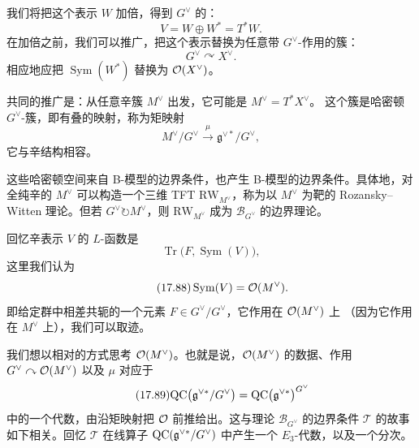
我们将把这个表示 $W$ 加倍，得到 $G^{\vee}$ 的：
\begin{equation}\tag{17.84}\label{eq:17.84}
V=W\oplus W^*=T^*W.
\end{equation}
在加倍之前，我们可以推广，把这个表示替换为任意带 $G^{\vee}$-作用的簇：
\begin{equation}\tag{17.85}\label{eq:17.85}
G^{\vee}\curvearrowright X^{\vee}.
\end{equation}
相应地应把 $\operatorname{Sym}(W^*)$ 替换为 $\mathcal{O}(X^{\vee})$。

共同的推广是：从任意辛簇 $M^{\vee}$ 出发，它可能是 $M^{\vee}=T^*X^{\vee}$。
这个簇是哈密顿 $G^{\vee}$-簇，即有叠的映射，称为矩映射
\begin{equation}\tag{17.86}\label{eq:17.86}
M^{\vee}/G^{\vee}\xrightarrow{\ \mu\ }\mathfrak g^{\vee*}/G^{\vee},
\end{equation}
它与辛结构相容。

这些哈密顿空间来自 B-模型的边界条件，也产生 B-模型的边界条件。具体地，对全纯辛的
$M^{\vee}$ 可以构造一个三维 TFT $\mathrm{RW}_{M^{\vee}}$，称为以 $M^{\vee}$ 为靶的
Rozansky--Witten 理论。但若 $G^{\vee}\circlearrowright M^{\vee}$，则 $\mathrm{RW}_{M^{\vee}}$
成为 $\mathcal B_{G^{\vee}}$ 的边界理论。

回忆辛表示 $V$ 的 $L$-函数是
\begin{equation}\tag{17.87}\label{eq:17.87}
\operatorname{Tr}\bigl(F,\operatorname{Sym}(V)\bigr),
\end{equation}
这里我们认为
\begin{equation}\tag{17.88}\label{eq:17.88}
\operatorname{Sym}(V)=\mathcal{O}(M^{\vee}).
\end{equation}
即给定群中相差共轭的一个元素 $F\in G^{\vee}/G^{\vee}$，它作用在 $\mathcal{O}(M^{\vee})$ 上
（因为它作用在 $M^{\vee}$ 上），我们可以取迹。

我们想以相对的方式思考 $\mathcal{O}(M^{\vee})$。也就是说，$\mathcal{O}(M^{\vee})$ 的数据、作用
$G^{\vee}\curvearrowright\mathcal{O}(M^{\vee})$ 以及 $\mu$ 对应于
\begin{equation}\tag{17.89}\label{eq:17.89}
\mathrm{QC}\bigl(\mathfrak g^{\vee*}/G^{\vee}\bigr)=\mathrm{QC}\bigl(\mathfrak g^{\vee*}\bigr)^{G^{\vee}}
\end{equation}
中的一个代数，由沿矩映射把 $\mathcal{O}$ 前推给出。这与理论 $\mathcal B_{G^{\vee}}$ 的边界条件
$\mathcal T$ 的故事如下相关。回忆 $\mathcal T$ 在线算子 $\mathrm{QC}(\mathfrak g^{\vee*}/G^{\vee})$
中产生一个 $E_3$-代数，以及一个分次。

